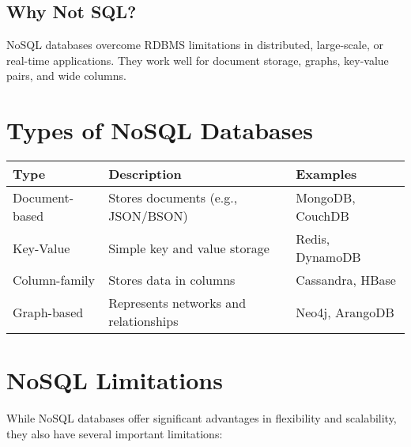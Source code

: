 \documentclass{article}
\begin{document}
\subsection{Why Not SQL?}
NoSQL databases overcome RDBMS limitations in distributed, large-scale, or real-time applications. They work well for document storage, graphs, key-value pairs, and wide columns.

\section{Types of NoSQL Databases}

\begin{center}
\begin{tabular}{@{}lll@{}}
\toprule
\textbf{Type} & \textbf{Description} & \textbf{Examples} \\
\midrule
Document-based & Stores documents (e.g., JSON/BSON) & MongoDB, CouchDB \\
Key-Value & Simple key and value storage & Redis, DynamoDB \\
Column-family & Stores data in columns & Cassandra, HBase \\
Graph-based & Represents networks and relationships & Neo4j, ArangoDB \\
\bottomrule
\end{tabular}
\end{center}

\section{NoSQL Limitations}

While NoSQL databases offer significant advantages in flexibility and scalability, they also have several important limitations:
\end{document}
